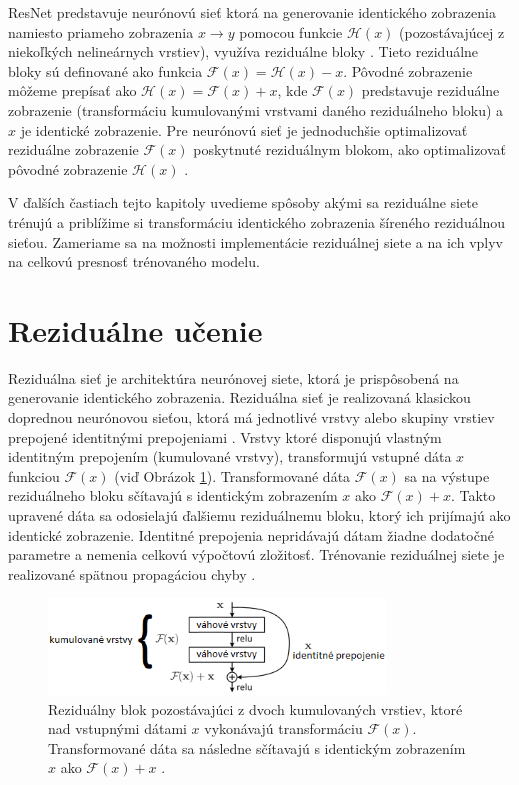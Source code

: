 ResNet predstavuje neurónovú sieť ktorá na generovanie identického zobrazenia namiesto priameho zobrazenia $x\rightarrow y$ pomocou funkcie $\mathcal{H}(x)$ (pozostávajúcej z niekoľkých nelineárnych vrstiev), využíva reziduálne bloky \cite{Wu2017}. Tieto reziduálne bloky sú definované ako funkcia $\mathcal{F}(x) = \mathcal{H}(x) - x$. Pôvodné zobrazenie môžeme prepísať ako $\mathcal{H}(x) = \mathcal{F}(x) + x$, kde $\mathcal{F}(x)$ predstavuje reziduálne zobrazenie (transformáciu kumulovanými vrstvami daného reziduálneho bloku) a $x$ je identické zobrazenie. Pre neurónovú sieť je jednoduchšie optimalizovať reziduálne zobrazenie $\mathcal{F}(x)$ poskytnuté reziduálnym blokom, ako optimalizovať pôvodné zobrazenie $\mathcal{H}(x)$ \cite{Wu2017}.

V ďalších častiach tejto kapitoly uvedieme spôsoby akými sa reziduálne siete trénujú a priblížime si transformáciu identického zobrazenia šíreného reziduálnou sieťou. Zameriame sa na možnosti implementácie reziduálnej siete a na ich vplyv na celkovú presnosť trénovaného modelu.

\section{Reziduálne učenie}
\label{residual_learning}

Reziduálna sieť je architektúra neurónovej siete, ktorá je prispôsobená na generovanie identického zobrazenia. Reziduálna sieť je realizovaná klasickou doprednou neurónovou sieťou, ktorá má jednotlivé vrstvy alebo skupiny vrstiev prepojené identitnými prepojeniami \cite{Wu2017}. Vrstvy ktoré disponujú vlastným identitným prepojením (kumulované vrstvy), transformujú vstupné dáta $x$ funkciou $\mathcal{F}(x)$ (viď Obrázok \ref{fig:residualBlock}). Transformované dáta $\mathcal{F}(x)$ sa na výstupe reziduálneho bloku sčítavajú s identickým zobrazením $x$ ako $\mathcal{F}(x)+x$. Takto upravené dáta sa odosielajú ďalšiemu reziduálnemu bloku, ktorý ich prijímajú ako identické zobrazenie. Identitné prepojenia nepridávajú dátam žiadne dodatočné parametre a nemenia celkovú výpočtovú zložitosť. Trénovanie reziduálnej siete je realizované spätnou propagáciou chyby \cite{Wu2017}.

\begin{figure}

\centerline{\includegraphics[width=0.8\textwidth]{images/residualBlock}}
\caption[Reziduálny blok]{Reziduálny blok pozostávajúci z dvoch kumulovaných vrstiev, ktoré nad vstupnými dátami $x$ vykonávajú transformáciu $\mathcal{F}(x)$. Transformované dáta sa následne sčítavajú s identickým zobrazením $x$ ako $\mathcal{F}(x) + x$ \cite{Wu2017}.}
\label{fig:residualBlock}
\end{figure}

